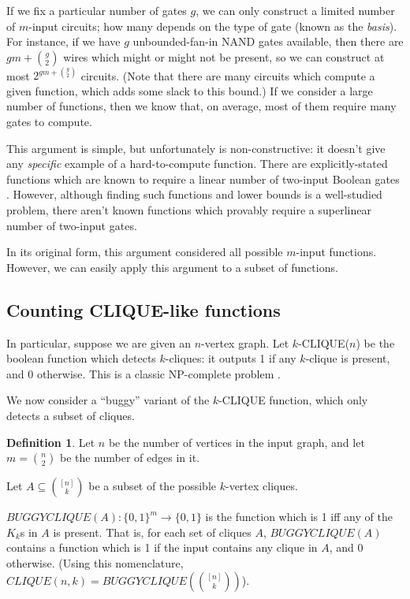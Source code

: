 \documentclass[12pt]{article}
\theoremstyle{definition}
\newtheorem{defn}{Definition}[section]
\begin{document}
If we fix a particular number of gates $g$, we can only construct a limited
number of $m$-input circuits; how many depends on the type of gate (known as
the {\em basis}).
For instance,
if we have $g$ unbounded-fan-in NAND gates available, then there are
$gm + {g \choose 2}$ wires which might or might not be present, so 
we can construct at most $2^{gm + {g \choose 2}}$ circuits.
(Note that there are many circuits which compute a given function,
which adds some slack to this bound.) If we consider a large number of functions,
then we know that, on average, most of them require many gates to compute.

This argument is simple, but unfortunately is non-constructive: it doesn't give any
{\em specific} example of a hard-to-compute function.
There are explicitly-stated functions which are known to require
a linear number of two-input Boolean gates \cite{iwama2002explicit}.
However, although finding such functions and lower bounds is
a well-studied problem, there aren't known functions which provably require
a superlinear number of two-input gates.

In its original form, this argument considered all possible $m$-input functions.
However, we can easily apply this argument to a subset of functions.

\subsection{Counting CLIQUE-like functions}

In particular, suppose we are given an $n$-vertex graph.
Let $k$-CLIQUE($n$) be the boolean function which
detects $k$-cliques: it outputs 1 if any $k$-clique
is present, and 0 otherwise. This is a classic
NP-complete problem \cite{aaronson_pnp}.

We now consider a ``buggy'' variant of the $k$-CLIQUE function,
which only detects a subset of cliques.

\begin{defn} \label{BUGGYCLIQUE}
Let $n$ be the number of vertices in the input graph, and
let $m = {n \choose 2}$ be the number of edges in it.

Let $A \subseteq {[n] \choose k}$ be a subset of the possible
$k$-vertex cliques.

$BUGGYCLIQUE(A): \{0,1\}^m \rightarrow \{0,1\}$ is the function which
is 1 iff any of the $K_k$s in $A$ is present.
That is, for each set of cliques $A$, $BUGGYCLIQUE(A)$
contains a function which is 1 if the input contains any clique in $A$,
and 0 otherwise. (Using this nomenclature,
$CLIQUE(n,k) = BUGGYCLIQUE({ [n] \choose k})$).
\end{defn}
\end{document}

